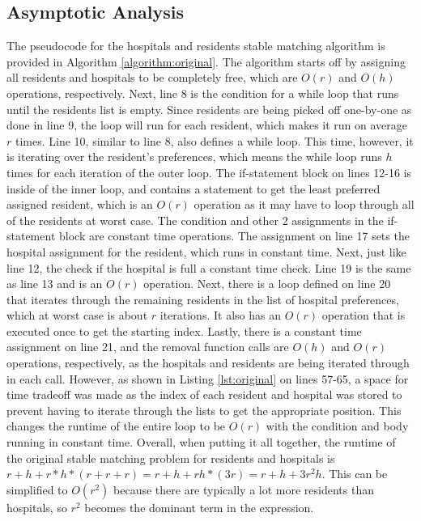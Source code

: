 \documentclass[letterpaper, 10pt,DIV=13]{scrartcl}
\numberwithin{equation}{section} %
\numberwithin{figure}{section} %
\numberwithin{table}{section} %
\begin{document}
\subsection{Asymptotic Analysis}
The pseudocode for the hospitals and residents stable matching algorithm is provided in Algorithm \ref{algorithm:original}. The algorithm starts off by assigning all residents and hospitals to be completely free, which are $O(r)$ and $O(h)$ operations, respectively. Next, line 8 is the condition for a while loop that runs until the residents list is empty. Since residents are being picked off one-by-one as done in line 9, the loop will run for each resident, which makes it run on average $r$ times. Line 10, similar to line 8, also defines a while loop. This time, however, it is iterating over the resident's preferences, which means the while loop runs $h$ times for each iteration of the outer loop. The if-statement block on lines 12-16 is inside of the inner loop, and contains a statement to get the least preferred assigned resident, which is an $O(r)$ operation as it may have to loop through all of the residents at worst case. The condition and other 2 assignments in the if-statement block are constant time operations. The assignment on line 17 sets the hospital assignment for the resident, which runs in constant time. Next, just like line 12, the check if the hospital is full a constant time check. Line 19 is the same as line 13 and is an $O(r)$ operation. Next, there is a loop defined on line 20 that iterates through the remaining residents in the list of hospital preferences, which at worst case is about $r$ iterations. It also has an $O(r)$ operation that is executed once to get the starting index. Lastly, there is a constant time assignment on line 21, and the removal function calls are $O(h)$ and $O(r)$ operations, respectively, as the hospitals and residents are being iterated through in each call. However, as shown in Listing \ref{lst:original} on lines 57-65, a space for time tradeoff was made as the index of each resident and hospital was stored to prevent having to iterate through the lists to get the appropriate position. This changes the runtime of the entire loop to be $O(r)$ with the condition and body running in constant time. Overall, when putting it all together, the runtime of the original stable matching problem for residents and hospitals is $r + h + r * h * (r + r + r) = r + h + rh * (3r) = r + h + 3r^2h$. This can be simplified to $O(r^2)$ because there are typically a lot more residents than hospitals, so $r^2$ becomes the dominant term in the expression.
\end{document}
